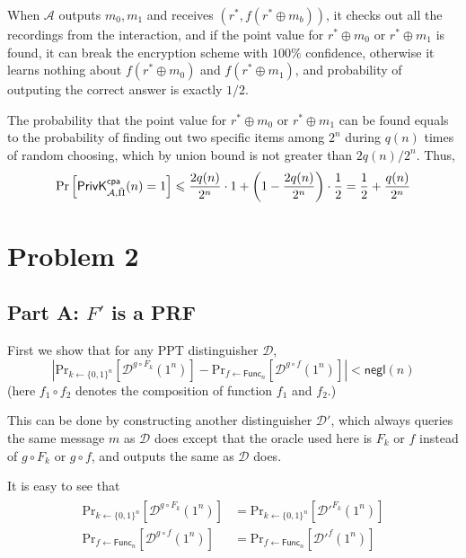 \documentclass[8pt]{article}
\theoremstyle{compact}
\def\le{\leqslant}
\begin{document}
When $\mathcal A$ outputs $m_0, m_1$ and receives $(r^*, f(r^* \oplus m_b))$, it checks out all the recordings from the interaction, and if the point value for $r^* \oplus m_0$ or $r^* \oplus m_1$ is found, it can break the encryption scheme with $100\%$ confidence, otherwise it learns nothing about $f(r^* \oplus m_0)$ and $f(r^* \oplus m_1)$, and probability of outputing the correct answer is exactly $1/2$.

The probability that the point value for $r^* \oplus m_0$ or $r^* \oplus m_1$ can be found equals to the probability of finding out two specific items among $2^n$ during $q(n)$ times of random choosing, which by union bound is not greater than $2q(n) / 2^n$. Thus, $$\text{Pr}\left[\PrivK{\mathcal A, \tilde{\Pi}}{cpa}(n) = 1\right] \le \frac{2q(n)}{2^n} \cdot 1 + \left(1 - \frac{2q(n)}{2^n}\right) \cdot \frac12 = \frac12 + \frac{q(n)}{2^n}$$


\section*{Problem 2}
\subsection*{Part A: $F'$ is a PRF}
First we show that for any PPT distinguisher $\mathcal D$, \begin{equation}
	\left| \text{Pr}_{k \gets \{0, 1\}^n}\left[\mathcal D^{g \circ F_k}(1^n)\right] - \text{Pr}_{f \gets \textsf{Func}_n}\left[\mathcal D^{g \circ f}(1^n)\right] \right| < \textsf{negl}(n)\label{2-A-1}
\end{equation}
(here $f_1 \circ f_2$ denotes the composition of function $f_1$ and $f_2$.)

This can be done by constructing another distinguisher $\mathcal D'$, which always queries the same message $m$ as $\mathcal D$ does except that the oracle used here is $F_k$ or $f$ instead of $g \circ F_k$ or $g \circ f$, and outputs the same as $\mathcal D$ does.

It is easy to see that \begin{align*}
	\begin{split}
		\text{Pr}_{k \gets \{0, 1\}^n}\left[\mathcal D^{g \circ F_k}(1^n)\right] &= \text{Pr}_{k \gets \{0, 1\}^n}\left[\mathcal D'^{F_k}(1^n)\right] \\
		\text{Pr}_{f \gets \textsf{Func}_n}\left[\mathcal D^{g \circ f}(1^n)\right] &= \text{Pr}_{f \gets \textsf{Func}_n}\left[\mathcal D'^{f}(1^n)\right] \\
	\end{split}
\end{align*}
\end{document}
